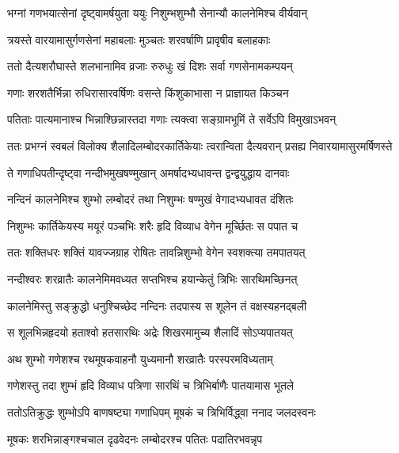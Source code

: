 \twolineshloka
{भग्नां गणभयात्सेनां दृष्ट्वामर्षयुता ययुः}
{निशुम्भशुम्भौ सेनान्यौ कालनेमिश्च वीर्यवान्} %


\twolineshloka
{त्रयस्ते वारयामासुर्गणसेनां महाबलाः}
{मुञ्चतः शरवर्षाणि प्रावृषीव बलाहकाः} %

\twolineshloka
{ततो दैत्यशरौघास्ते शलभानामिव व्रजाः}
{रुरुधुः खं दिशः सर्वा गणसेनामकम्पयन्} %

\twolineshloka
{गणाः शरशतैर्भिन्ना रुधिरासारवर्षिणः}
{वसन्ते किंशुकाभासा न प्राज्ञायत किञ्चन} %

\twolineshloka
{पतिताः पात्यमानाश्च भिन्नाश्छिन्नास्तदा गणाः}
{त्यक्त्वा सङ्ग्रामभूमिं ते सर्वेऽपि विमुखाऽभवन्} %

\fourlineindentedshloka
{ततः प्रभग्नं स्वबलं विलोक्य}
{शैलादिलम्बोदरकार्तिकेयाः}
{त्वरान्विता दैत्यवरान् प्रसह्य}
{निवारयामासुरमर्षिणस्ते} %





\twolineshloka
{ते गणाधिपतीन्दृष्ट्वा नन्दीभमुखषण्मुखान्}
{अमर्षादभ्यधावन्त द्वन्द्वयुद्धाय दानवाः} %

\twolineshloka
{नन्दिनं कालनेमिश्च शुम्भो लम्बोदरं तथा}
{निशुम्भः षण्मुखं वेगादभ्यधावत दंशितः} %

\twolineshloka
{निशुम्भः कार्तिकेयस्य मयूरं पञ्चभिः शरैः}
{हृदि विव्याध वेगेन मूर्च्छितः स पपात च} %

\twolineshloka
{ततः शक्तिधरः शक्तिं यावज्जग्राह रोषितः}
{तावन्निशुम्भो वेगेन स्वशक्त्या तमपातयत्} %

\twolineshloka
{नन्दीश्वरः शरव्रातैः कालनेमिमवध्यत}
{सप्तभिश्च हयान्केतुं त्रिभिः सारथिमच्छिनत्} %

\twolineshloka
{कालनेमिस्तु सङ्क्रुद्धो धनुश्चिच्छेद नन्दिनः}
{तदपास्य स शूलेन तं वक्षस्यहनद्बली} %

\twolineshloka
{स शूलभिन्नहृदयो हताश्वो हतसारथिः}
{अद्रेः शिखरमामुच्य शैलादिं सोऽप्यपातयत्} %

\twolineshloka
{अथ शुम्भो गणेशश्च रथमूषकवाहनौ}
{युध्यमानौ शरव्रातैः परस्परमविध्यताम्} %

\twolineshloka
{गणेशस्तु तदा शुम्भं हृदि विव्याध पत्रिणा}
{सारथिं च त्रिभिर्बाणैः पातयामास भूतले} %

\twolineshloka
{ततोऽतिक्रुद्धः शुम्भोऽपि बाणषष्ट्या गणाधिपम्}
{मूषकं च त्रिभिर्विद्ध्वा ननाद जलदस्वनः} %

\twolineshloka
{मूषकः शरभिन्नाङ्गश्चचाल दृढवेदनः}
{लम्बोदरश्च पतितः पदातिरभवन्नृप} %

